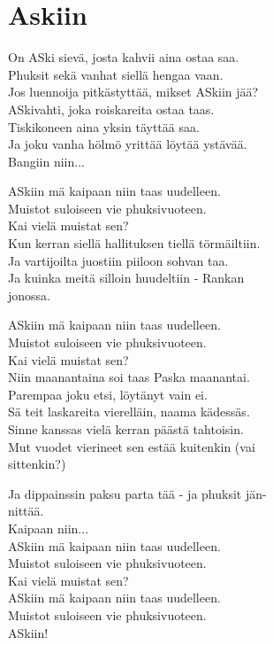 \section{Askiin}
On ASki sievä, josta kahvii aina ostaa saa.\\
Phuksit sekä vanhat siellä hengaa vaan.\\
Jos luennoija pitkästyttää, mikset ASkiin jää?\\
ASkivahti, joka roiskareita ostaa taas.\\
Tiskikoneen aina yksin täyttää saa.\\
Ja joku vanha hölmö yrittää löytää ystävää.\\
Bangiin niin...

ASkiin mä kaipaan niin taas uudelleen.\\
Muistot suloiseen vie phuksivuoteen.\\
Kai vielä muistat sen?\\
Kun kerran siellä hallituksen tiellä törmäiltiin.\\
Ja vartijoilta juostiin piiloon sohvan taa.\\
Ja kuinka meitä silloin huudeltiin - Rankan\\
jonossa.

ASkiin mä kaipaan niin taas uudelleen.\\
Muistot suloiseen vie phuksivuoteen.\\
Kai vielä muistat sen?\\
Niin maanantaina soi taas Paska maanantai.\\
Parempaa joku etsi, löytänyt vain ei.\\
Sä teit laskareita vierelläin, naama kädessäs.\\
Sinne kanssas vielä kerran päästä tahtoisin.\\
Mut vuodet vierineet sen estää kuitenkin (vai\\
sittenkin?)

Ja dippainssin paksu parta tää - ja phuksit jän-\\
nittää.\\
Kaipaan niin...\\
ASkiin mä kaipaan niin taas uudelleen.\\
Muistot suloiseen vie phuksivuoteen.\\
Kai vielä muistat sen?\\
ASkiin mä kaipaan niin taas uudelleen.\\
Muistot suloiseen vie phuksivuoteen.\\
ASkiin!